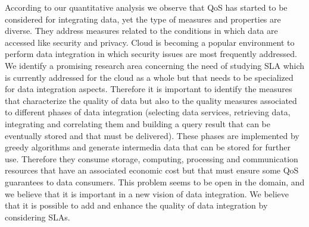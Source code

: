 According to our quantitative analysis we observe that QoS has started to be considered for integrating data, yet the type of measures and properties are diverse. They address measures related to the conditions in which data are accessed like security and privacy. Cloud is becoming a popular environment to perform data integration in which security issues are most frequently addressed. We identify a promising research area concerning the need of studying SLA which is currently addressed  for the cloud as a whole \cite{PedrinaciCL14} but that needs to be specialized for data integration aspects. Therefore it is important to identify the measures that characterize the quality of data but also to the quality measures associated to different phases of data integration (selecting data services, retrieving data, integrating and correlating them and building a query result that can be eventually stored and that must be delivered). These phases are implemented by greedy algorithms and generate intermedia data that can be stored for further use. Therefore they consume storage, computing, processing and communication resources that have an associated economic cost but that must ensure some QoS guarantees to data consumers. This problem seems to be open in the domain, and we believe that it is important in a new vision of data integration. We believe that it is possible to add and enhance the quality of data integration by considering SLAs.


% 
